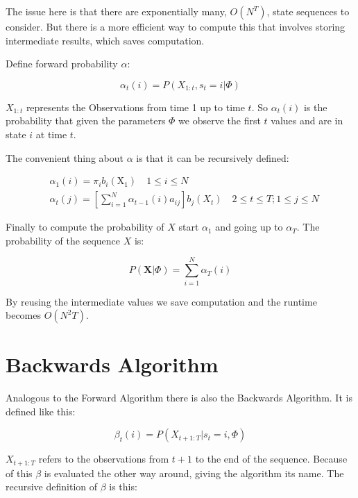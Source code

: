 The issue here is that there are exponentially many, $O(N^{T})$, state sequences to consider. But there is a more efficient way to compute this that involves storing intermediate results, which saves computation. 

Define forward probability $\alpha$:

\begin{equation}
   \alpha_{t}(i)=P\left(X_{1:t}, s_{t}=i | \Phi\right) 
\end{equation}

$X_{1:t}$ represents the Observations from time 1 up to time $t$. So $\alpha_{t}(i)$ is the probability that given the parameters $\Phi$ we observe the first $t$ values and are in state $i$ at time $t$.

The convenient thing about $\alpha$ is that it can be recursively defined:

\begin{equation}
\begin{aligned}
&\alpha_{1}(i)=\pi_{i} b_{i}\left(\mathrm{X}_{1}\right) \quad 1 \leq i \leq N \\
&\alpha_{t}(j)=\left[\sum_{i=1}^{N} \alpha_{t-1}(i) a_{i j}\right] b_{j}\left(X_{t}\right) \quad 2 \leq t \leq T ; 1 \leq j \leq N
\end{aligned}
\label{eq:alpha-def}
\end{equation}


Finally to compute the probability of $X$ start $\alpha_1$ and going up to $\alpha_T$. The probability of the sequence $X$ is:

\begin{equation}
   P(\mathbf{X} | \Phi)=\sum_{i=1}^{N} \alpha_{T}(i) 
  \label{eq:prop-statement}
\end{equation}

By reusing the intermediate values we save computation and the runtime becomes $O(N^2 T)$. \parencite{huang2001spoken}

\section{Backwards Algorithm}

Analogous to the Forward Algorithm there is also the Backwards Algorithm. It is defined like this:

\begin{equation}
   \beta_{t}(i)=P\left(X_{t+1:T} | s_{t}=i, \Phi\right) 
\end{equation}

$X_{t+1:T}$ refers to the observations from $t+1$ to the end of the sequence. Because of this $\beta$ is evaluated the other way around, giving the algorithm its name. The recursive definition of $\beta$ is this:

